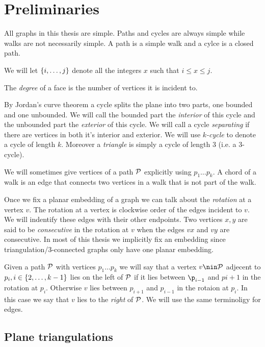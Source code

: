 
\section{Preliminaries}
All graphs in this thesis are simple. Paths and cycles are always simple while walks are not necessarily simple. A path is a simple walk and a cylce is a closed path.

We will let $\braces {i, \ldots, j}$ denote all the integers $x$ such that $i \leq x \leq j$.

The \emph{degree} of a face is the number of vertices it is incident to.

By Jordan's curve theorem a cycle splits the plane into two parts, one bounded and one unbounded. 
We will call the bounded part the \emph{interior} of this cycle and the unbounded part the \emph{exterior} of this cycle.
We will call a cycle \emph{separating} if there are vertices in both it's interior and exterior. We will use \emph{$k$-cycle} to denote a cycle of length $k$. Moreover a \emph{triangle} is simply a cycle of length $3$ (i.e. a $3$-cycle).

We will sometimes give vertices of a path $\P$ explicitly using $p_1 \ldots p_k$. A chord of a walk is an edge that connects two vertices in a walk that is not part of the walk.

Once we fix a planar embedding of a graph we can talk about the \emph{rotation} at a vertex $v$. The rotation at a vertex is clockwise order of the edges incident to $v$. We will indentify these edges with their other endpoints. Two vertices $x, y$ are said to be \emph{consecutive} in the rotation at $v$ when the edges $vx$ and $vy$ are consecutive. In most of this thesis we implicitly fix an embedding since triangulation/3-connected  graphs only have one planar embedding.

Given a path $\P$ with vertices $p_1 \ldots p_k$ we will say that a vertex $v \nin \P$ adjecent to $p_i, i \in \braces{2, \ldots, k-1}$ lies on the left of $\P$ if it lies between $\p_{i-1}$ and $p{i+1}$ in the rotation at $p_{i}$. Otherwise $v$ lies between $p_{i+1}$ and $p_{i-1}$ in the rotaion at $p_i$. In this case we say that $v$ lies to the \emph{right} of $\P$.
We will use the same terminoligy  for edges.



\subsection{Plane triangulations}

